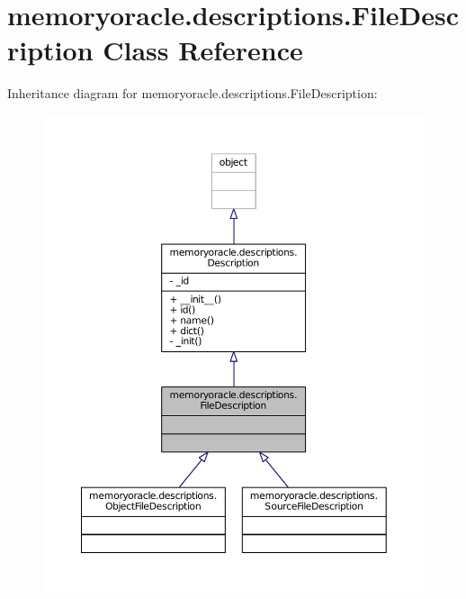 \hypertarget{classmemoryoracle_1_1descriptions_1_1FileDescription}{}\section{memoryoracle.\+descriptions.\+File\+Description Class Reference}
\label{classmemoryoracle_1_1descriptions_1_1FileDescription}


Inheritance diagram for memoryoracle.\+descriptions.\+File\+Description\+:\nopagebreak
\begin{figure}[H]
\begin{center}
\leavevmode
\includegraphics[width=350pt]{classmemoryoracle_1_1descriptions_1_1FileDescription__inherit__graph}
\end{center}
\end{figure}


